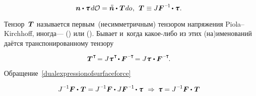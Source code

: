 \begin{otherlanguage}{russian}
\vspace{-0.2em} \noindent {}

\nopagebreak\vspace{-0.16em}\begin{equation}\label{dualexpressionofsurfaceforce}
\currentunitnormal \dotp \cauchystress \hspace{.25ex} d\mathcal{O}
= \initialunitnormal \dotp \hspace{.12ex} \firstpiolakirchhoffstress \hspace{.1ex} do
\hspace{.1ex}, \:\:
\firstpiolakirchhoffstress \hspace{.1ex} \equiv J \bm{F}^{\hspace{.1ex}\expminusone} \hspace{-0.2ex} \dotp \cauchystress \hspace{.1ex}.
\end{equation}

\vspace{-0.2em}
Тензор~${\hspace{.1ex}\bm{T}}$ называется первым~(несимметричным) тензором напряжения Piola--Kirchhoff, иногда\:---  () или  (). Бывает и~когда какое\hbox{-}либо из этих (на)именований даётся транспонированному тензору

\nopagebreak\vspace{-0.1em}\begin{equation*}
\firstpiolakirchhoffstress^{\hspace{.1ex}\T} \hspace{-0.32ex}
= J \cauchystress^{\hspace{.16ex}\T} \hspace{-0.32ex} \dotp \bm{F}^{\hspace{.1ex}\expminusT} \hspace{-0.32ex}
= J \cauchystress \hspace{.16ex} \dotp \bm{F}^{\hspace{.1ex}\expminusT} \hspace{-0.25ex}.
\end{equation*}

Обращение~\eqref{dualexpressionofsurfaceforce}

\begin{equation*}
J^{\hspace{.12ex}\expminusone} \bm{F} \dotp \hspace{.16ex} \firstpiolakirchhoffstress = J^{\hspace{.12ex}\expminusone} \bm{F} \dotp J \bm{F}^{\hspace{.16ex}\expminusone} \hspace{-0.2ex} \dotp \cauchystress
\:\,\Rightarrow\:
\cauchystress = J^{\hspace{.12ex}\expminusone} \bm{F} \dotp \hspace{.16ex} \firstpiolakirchhoffstress
\end{equation*}


\end{otherlanguage}
